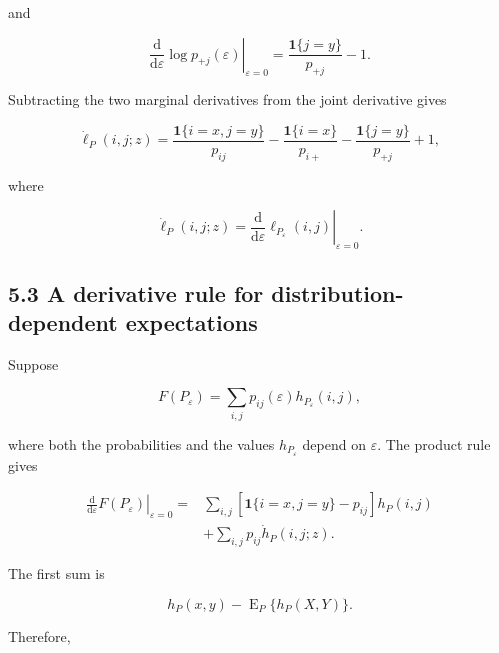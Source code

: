 \documentclass[
  11pt]{article}
\begin{document}
and

\begin{equation}
\left.
\frac{\mathrm d}{\mathrm d\varepsilon}\log p_{+j}(\varepsilon)
\right|_{\varepsilon=0}
=\frac{\mathbf 1\{j=y\}}{p_{+j}}-1.
\end{equation}

Subtracting the two marginal derivatives from the joint derivative gives

\begin{equation}
\boxed{
\dot\ell_P(i,j;z)
=
\frac{\mathbf 1\{i=x,j=y\}}{p_{ij}}
-\frac{\mathbf 1\{i=x\}}{p_{i+}}
-\frac{\mathbf 1\{j=y\}}{p_{+j}}
+1,
}
\end{equation}

where

\begin{equation}
\dot\ell_P(i,j;z)
=\left.
\frac{\mathrm d}{\mathrm d\varepsilon}
\ell_{P_\varepsilon}(i,j)
\right|_{\varepsilon=0}.
\end{equation}

\subsection{5.3 A derivative rule for distribution-dependent
expectations}\label{a-derivative-rule-for-distribution-dependent-expectations}

Suppose

\begin{equation}
F(P_\varepsilon)
=\sum_{i,j}p_{ij}(\varepsilon)h_{P_\varepsilon}(i,j),
\end{equation}

where both the probabilities and the values \(h_{P_\varepsilon}\) depend
on \(\varepsilon\). The product rule gives

\begin{equation}
\begin{aligned}
\left.\frac{\mathrm d}{\mathrm d\varepsilon}F(P_\varepsilon)
\right|_{\varepsilon=0}
={}&\sum_{i,j}
\left[\mathbf 1\{i=x,j=y\}-p_{ij}\right]h_P(i,j)\\
&+\sum_{i,j}p_{ij}\dot h_P(i,j;z).
\end{aligned}
\end{equation}

The first sum is

\begin{equation}
h_P(x,y)-\operatorname E_P\{h_P(X,Y)\}.
\end{equation}

Therefore,
\end{document}
